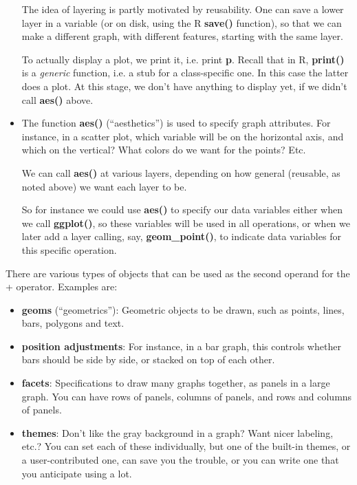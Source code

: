 \begin{itemize}
The idea of layering is partly motivated by reusability.  One can save a
lower layer in a variable (or on disk, using the R {\bf save()}
function), so that we can make a different graph, with different
features, starting with the same layer.

To actually display a plot, we print it, i.e. print {\bf p}.  Recall
that in R, {\bf print()} is a {\it generic} function, i.e. a stub for a
class-specific one.  In this case the latter does a plot.  At this
stage, we don't have anything to display yet, if we didn't call {\bf
aes()} above.

\item The function {\bf aes()} (``aesthetics'') is used to specify
graph attributes.  For instance, in a scatter plot, which variable will
be on the horizontal axis, and which on the vertical?  What colors do we
want for the points?  Etc.

We can call {\bf aes()} at various layers, depending on how general
(reusable, as noted above) we want each layer to be.  

So for instance we could use {\bf aes()} to specify our data variables
either when we call {\bf ggplot()}, so these variables will be used in
all operations, or when we later add a layer calling, say, {\bf
geom\_point()}, to indicate data variables for this specific operation.

\end{itemize}

There are various types of objects that can be used as the second
operand for the + operator.  Examples are:

\begin{itemize}

\item {\bf geoms} (``geometrics''):  Geometric objects to be drawn, such
as points, lines, bars, polygons and text.

\item {\bf position adjustments}:  For instance, in a bar graph, this
controls whether bars should be side by side, or stacked on top of each
other.

\item {\bf facets}:  Specifications to draw many graphs together, as
panels in a large graph.  You can have rows of panels, columns of
panels, and rows and columns of panels.

\item {\bf themes}:  Don't like the gray background in a graph?  Want
nicer labeling, etc.?  You can set each of these individually, but one
of the built-in themes, or a user-contributed one, can save you the
trouble, or you can write one that you anticipate using a lot.

\end{itemize}


